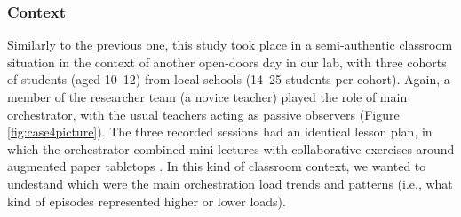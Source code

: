 \documentclass[10pt,journal,compsoc]{IEEEtran}
\begin{document}

\subsubsection{Context}

Similarly to the previous one, this study took place in a semi-authentic classroom situation in the context of another open-doors day in our lab, with three cohorts of students (aged 10--12) from local schools (14--25 students per cohort). Again, a member of the researcher team (a novice teacher) played the role of main orchestrator, with the usual teachers acting as passive observers (Figure \ref{fig:case4picture}). The three recorded sessions had an identical lesson plan, in which the orchestrator combined mini-lectures with collaborative exercises around augmented paper tabletops \cite{caballero2014single}. In this kind of classroom context, we wanted to undestand which were the main orchestration load trends and patterns (i.e., what kind of episodes represented higher or lower loads).

\end{document}
